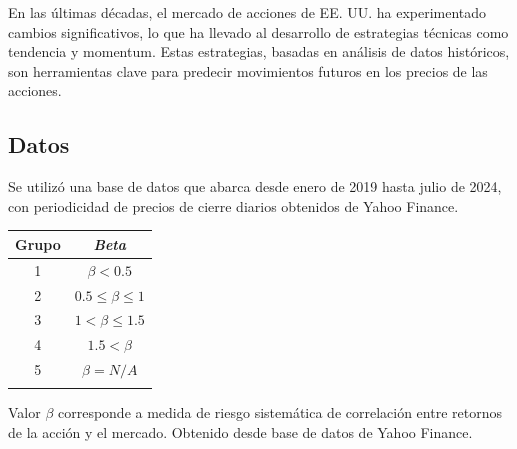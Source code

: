\documentclass[a0,portrait]{a0poster}
\newcommand{\customsection}[1]{
    \begin{center}
        \begin{tcolorbox}[colframe=miRojo!50, colback=miRojo, width=\linewidth, boxrule=1mm, arc=3mm, auto outer arc]
            \centering
            \vspace{.5cm} %
            \color{white}
            \section*{ \textbf{\Huge #1}}  %
            \vspace{.2cm} %
        \end{tcolorbox}
    \end{center}
}
\begin{document}
\begin{multicols}{2}
     En las últimas décadas, el mercado de acciones de EE. UU. ha experimentado cambios significativos, lo que ha llevado al
      desarrollo de estrategias técnicas como tendencia y momentum. Estas estrategias, basadas en análisis de datos históricos, 
      son herramientas clave para predecir movimientos futuros en los precios de las acciones.
    \customsection{Datos}
    \par
    Se utilizó una base de datos que abarca desde enero de 2019 hasta julio de 2024, con periodicidad de precios de cierre 
    diarios obtenidos de Yahoo Finance.\\
    \begin{minipage}{.984\linewidth}
        \centering
        \vspace{1cm}
        \begin{tabular}{cc}
            \toprule
            \textbf{Grupo} & \textbf{\textit{Beta}}  \\
            \midrule
            1   &  $\beta < 0.5$                      \\
            2       & $0.5 \leq \beta \leq 1$    \\
            3      & $1 < \beta \leq 1.5$    \\
            4       & $1.5 < \beta $    \\
            5       & $\beta =N/A$    \\
            \bottomrule
            \vspace{.5cm}
        \end{tabular}
        \captionsetup{width=0.8\textwidth}  %
        \caption*{\footnotesize Valor $\beta$ corresponde a medida 
        de riesgo sistemática de correlación entre retornos de la acción 
        y el mercado. Obtenido desde base de datos de Yahoo Finance.
        }


\end{minipage}
\end{multicols}
\end{document}
